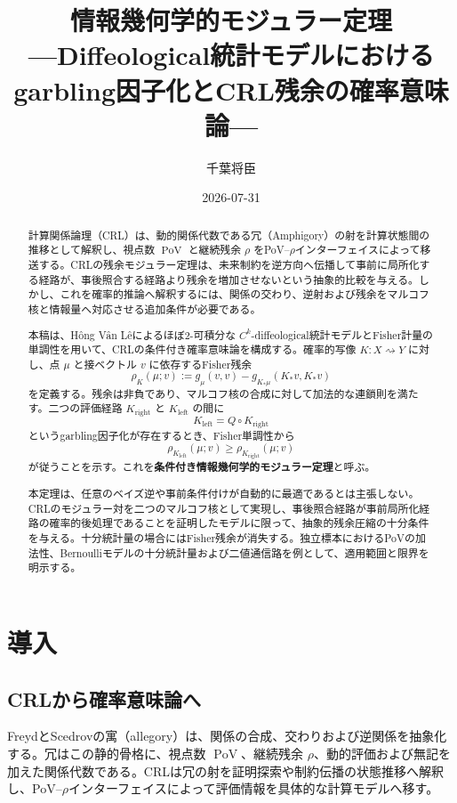 \documentclass[a4paper,11pt]{ltjsarticle}
\title{情報幾何学的モジュラー定理\\
{\large ---Diffeological統計モデルにおけるgarbling因子化とCRL残余の確率意味論---}}
\author{千葉将臣}
\date{2026-07-31}
\theoremstyle{definition}
\theoremstyle{plain}
\newcommand{\PoV}{\operatorname{PoV}}
\begin{document}
\maketitle

\begin{abstract}
計算関係論理（CRL）は、動的関係代数である冗（Amphigory）の射を計算状態間の推移として解釈し、視点数 $\PoV$ と継続残余 $\rho$ をPoV--$\rho$インターフェイスによって移送する。CRLの残余モジュラー定理は、未来制約を逆方向へ伝播して事前に局所化する経路が、事後照合する経路より残余を増加させないという抽象的比較を与える。しかし、これを確率的推論へ解釈するには、関係の交わり、逆射および残余をマルコフ核と情報量へ対応させる追加条件が必要である。

本稿は、Hông Vân Lêによるほぼ2-可積分な $C^k$-diffeological統計モデルとFisher計量の単調性を用いて、CRLの条件付き確率意味論を構成する。確率的写像 $K:X\rightsquigarrow Y$ に対し、点 $\mu$ と接ベクトル $v$ に依存するFisher残余
\[
 \rho_K(\mu;v)
 :=g_\mu(v,v)-g_{K_*\mu}(K_*v,K_*v)
\]
を定義する。残余は非負であり、マルコフ核の合成に対して加法的な連鎖則を満たす。二つの評価経路 $K_{\mathrm{right}}$ と $K_{\mathrm{left}}$ の間に
\[
 K_{\mathrm{left}}=Q\circ K_{\mathrm{right}}
\]
というgarbling因子化が存在するとき、Fisher単調性から
\[
 \rho_{K_{\mathrm{left}}}(\mu;v)
 \geq
 \rho_{K_{\mathrm{right}}}(\mu;v)
\]
が従うことを示す。これを\textbf{条件付き情報幾何学的モジュラー定理}と呼ぶ。

本定理は、任意のベイズ逆や事前条件付けが自動的に最適であるとは主張しない。CRLのモジュラー対を二つのマルコフ核として実現し、事後照合経路が事前局所化経路の確率的後処理であることを証明したモデルに限って、抽象的残余圧縮の十分条件を与える。十分統計量の場合にはFisher残余が消失する。独立標本におけるPoVの加法性、Bernoulliモデルの十分統計量および二値通信路を例として、適用範囲と限界を明示する。
\end{abstract}

\tableofcontents

\section{導入}

\subsection{CRLから確率意味論へ}

FreydとScedrovの寓（allegory）は、関係の合成、交わりおよび逆関係を抽象化する\cite{FreydScedrov1990}。冗はこの静的骨格に、視点数 $\PoV$、継続残余 $\rho$、動的評価および無記を加えた関係代数である\cite{ChibaAmphigory2026}。CRLは冗の射を証明探索や制約伝播の状態推移へ解釈し、PoV--$\rho$インターフェイスによって評価情報を具体的な計算モデルへ移す\cite{ChibaCRL2026}。
\end{document}
